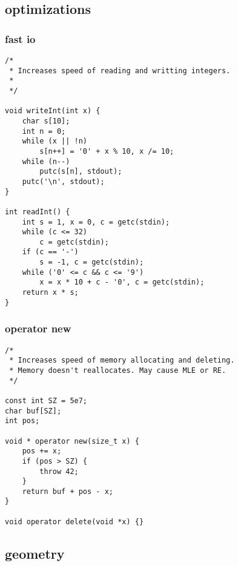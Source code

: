 \subsection{optimizations}
\subsubsection{fast io}
\begin{lstlisting}
/*
 * Increases speed of reading and writting integers.
 *
 */

void writeInt(int x) {
    char s[10];
    int n = 0;
    while (x || !n)
        s[n++] = '0' + x % 10, x /= 10;
    while (n--)
        putc(s[n], stdout);
    putc('\n', stdout);
}

int readInt() {
    int s = 1, x = 0, c = getc(stdin);
    while (c <= 32)
        c = getc(stdin);
    if (c == '-')
        s = -1, c = getc(stdin);
    while ('0' <= c && c <= '9')
        x = x * 10 + c - '0', c = getc(stdin);
    return x * s;
}
\end{lstlisting}
\subsubsection{operator new}
\begin{lstlisting}
/*
 * Increases speed of memory allocating and deleting.
 * Memory doesn't reallocates. May cause MLE or RE.
 */

const int SZ = 5e7;
char buf[SZ];
int pos;

void * operator new(size_t x) {
    pos += x;
    if (pos > SZ) {
        throw 42;
    }
    return buf + pos - x;
}

void operator delete(void *x) {}
\end{lstlisting}
\subsection{geometry}
